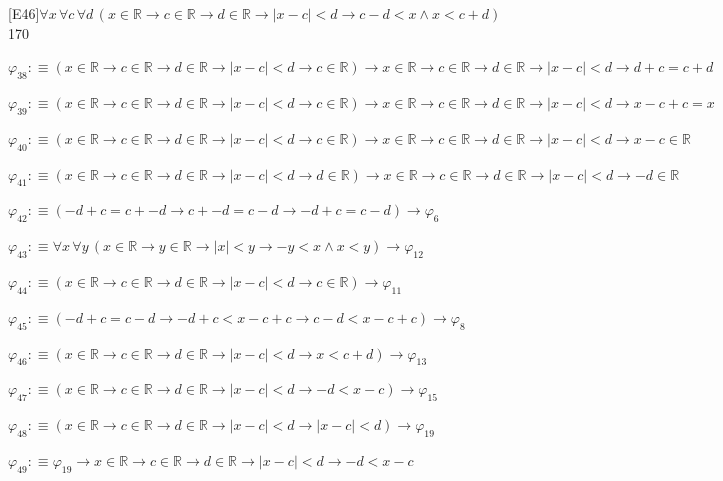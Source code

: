 \begin{fullproof}{[E46]}{$\forall x\,\forall c\,\forall d\,(x \in \mathbb{R} \to c \in \mathbb{R} \to d \in \mathbb{R} \to \lvert x - c \rvert < d \to c - d < x \land x < c + d)$}{170}
\begin{abbrevlist}
\item $\varphi_{38} :\equiv (x \in \mathbb{R} \to c \in \mathbb{R} \to d \in \mathbb{R} \to \lvert x - c \rvert < d \to c \in \mathbb{R}) \to x \in \mathbb{R} \to c \in \mathbb{R} \to d \in \mathbb{R} \to \lvert x - c \rvert < d \to d + c = c + d$
\item $\varphi_{39} :\equiv (x \in \mathbb{R} \to c \in \mathbb{R} \to d \in \mathbb{R} \to \lvert x - c \rvert < d \to c \in \mathbb{R}) \to x \in \mathbb{R} \to c \in \mathbb{R} \to d \in \mathbb{R} \to \lvert x - c \rvert < d \to x - c + c = x$
\item $\varphi_{40} :\equiv (x \in \mathbb{R} \to c \in \mathbb{R} \to d \in \mathbb{R} \to \lvert x - c \rvert < d \to c \in \mathbb{R}) \to x \in \mathbb{R} \to c \in \mathbb{R} \to d \in \mathbb{R} \to \lvert x - c \rvert < d \to x - c \in \mathbb{R}$
\item $\varphi_{41} :\equiv (x \in \mathbb{R} \to c \in \mathbb{R} \to d \in \mathbb{R} \to \lvert x - c \rvert < d \to d \in \mathbb{R}) \to x \in \mathbb{R} \to c \in \mathbb{R} \to d \in \mathbb{R} \to \lvert x - c \rvert < d \to -d \in \mathbb{R}$
\item $\varphi_{42} :\equiv (-d + c = c + -d \to c + -d = c - d \to -d + c = c - d) \to \varphi_{6}$
\item $\varphi_{43} :\equiv \forall x\,\forall y\,(x \in \mathbb{R} \to y \in \mathbb{R} \to \lvert x \rvert < y \to -y < x \land x < y) \to \varphi_{12}$
\item $\varphi_{44} :\equiv (x \in \mathbb{R} \to c \in \mathbb{R} \to d \in \mathbb{R} \to \lvert x - c \rvert < d \to c \in \mathbb{R}) \to \varphi_{11}$
\item $\varphi_{45} :\equiv (-d + c = c - d \to -d + c < x - c + c \to c - d < x - c + c) \to \varphi_{8}$
\item $\varphi_{46} :\equiv (x \in \mathbb{R} \to c \in \mathbb{R} \to d \in \mathbb{R} \to \lvert x - c \rvert < d \to x < c + d) \to \varphi_{13}$
\item $\varphi_{47} :\equiv (x \in \mathbb{R} \to c \in \mathbb{R} \to d \in \mathbb{R} \to \lvert x - c \rvert < d \to -d < x - c) \to \varphi_{15}$
\item $\varphi_{48} :\equiv (x \in \mathbb{R} \to c \in \mathbb{R} \to d \in \mathbb{R} \to \lvert x - c \rvert < d \to \lvert x - c \rvert < d) \to \varphi_{19}$
\item $\varphi_{49} :\equiv \varphi_{19} \to x \in \mathbb{R} \to c \in \mathbb{R} \to d \in \mathbb{R} \to \lvert x - c \rvert < d \to -d < x - c$

\end{abbrevlist}
\end{fullproof}
